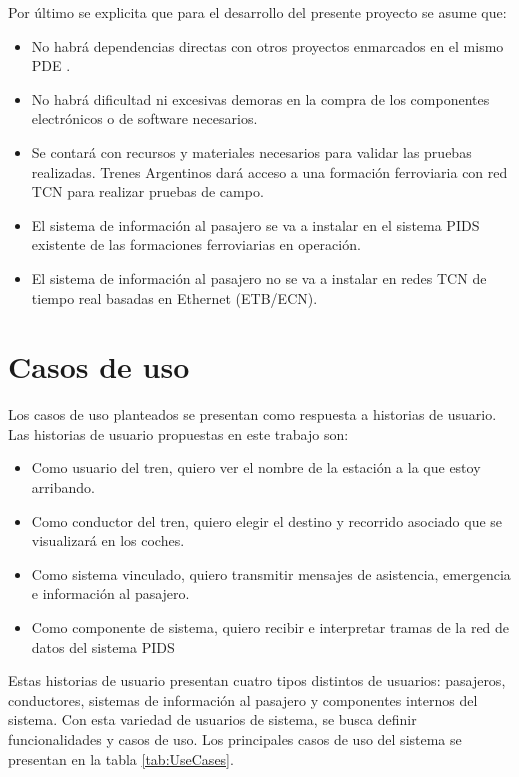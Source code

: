 Por último se explicita que para el desarrollo del presente proyecto se asume que:

\begin{itemize}
\item No habrá dependencias directas con otros proyectos enmarcados en el mismo PDE \citep{PDE-TCN}.
\item No habrá dificultad ni excesivas demoras en la compra de los componentes electrónicos o
de software necesarios.
\item Se contará con recursos y materiales necesarios para validar las pruebas realizadas.
Trenes Argentinos dará acceso a una formación ferroviaria con red TCN para realizar
pruebas de campo.
\item El sistema de información al pasajero se va a instalar en el sistema PIDS existente de las formaciones ferroviarias en operación.
\item El sistema de información al pasajero no se va a instalar en redes TCN de tiempo real
basadas en Ethernet (ETB/ECN).
\end{itemize}


\section{Casos de uso}
Los casos de uso planteados se presentan como respuesta a historias de usuario. Las historias de usuario propuestas en este trabajo son:
\begin{itemize}
\item Como usuario del tren, quiero ver el nombre de la estación a la que estoy arribando.
\item Como conductor del tren, quiero elegir el destino y recorrido asociado que se visualizará en los coches.
\item Como sistema vinculado, quiero transmitir mensajes de asistencia, emergencia e información al pasajero.
\item Como componente de sistema, quiero recibir e interpretar tramas de la red de datos del sistema PIDS
\end{itemize}

Estas historias de usuario presentan cuatro tipos distintos de usuarios: pasajeros, conductores, sistemas de información al pasajero y componentes internos del sistema. Con esta variedad de usuarios de sistema, se busca definir funcionalidades y casos de uso. Los principales casos de uso del sistema se presentan en la tabla \ref{tab:UseCases}. \\

